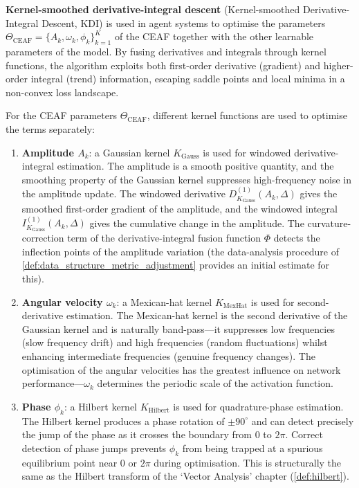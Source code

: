 \begin{definition}\label{def:kdi_agent}
\textbf{Kernel-smoothed derivative-integral descent} (Kernel-smoothed Derivative-Integral Descent, KDI) is used in agent systems to optimise the parameters $\Theta_{\text{CEAF}} = \{A_k, \omega_k, \phi_k\}_{k=1}^{K}$ of the CEAF together with the other learnable parameters of the model. By fusing derivatives and integrals through kernel functions, the algorithm exploits both first-order derivative (gradient) and higher-order integral (trend) information, escaping saddle points and local minima in a non-convex loss landscape.

For the CEAF parameters $\Theta_{\text{CEAF}}$, different kernel functions are used to optimise the terms separately:
\begin{enumerate}[label=(\roman*)]
    \item \textbf{Amplitude $A_k$}: a Gaussian kernel $K_{\text{Gauss}}$ is used for windowed derivative-integral estimation. The amplitude is a smooth positive quantity, and the smoothing property of the Gaussian kernel suppresses high-frequency noise in the amplitude update. The windowed derivative $D_{K_{\text{Gauss}}}^{(1)}(A_k, \Delta)$ gives the smoothed first-order gradient of the amplitude, and the windowed integral $I_{K_{\text{Gauss}}}^{(1)}(A_k, \Delta)$ gives the cumulative change in the amplitude. The curvature-correction term of the derivative-integral fusion function $\Phi$ detects the inflection points of the amplitude variation (the data-analysis procedure of \cref{def:data_structure_metric_adjustment} provides an initial estimate for this).
    \item \textbf{Angular velocity $\omega_k$}: a Mexican-hat kernel $K_{\text{MexHat}}$ is used for second-derivative estimation. The Mexican-hat kernel is the second derivative of the Gaussian kernel and is naturally band-pass---it suppresses low frequencies (slow frequency drift) and high frequencies (random fluctuations) whilst enhancing intermediate frequencies (genuine frequency changes). The optimisation of the angular velocities has the greatest influence on network performance---$\omega_k$ determines the periodic scale of the activation function.
    \item \textbf{Phase $\phi_k$}: a Hilbert kernel $K_{\text{Hilbert}}$ is used for quadrature-phase estimation. The Hilbert kernel produces a phase rotation of $\pm 90^\circ$ and can detect precisely the jump of the phase as it crosses the boundary from $0$ to $2\pi$. Correct detection of phase jumps prevents $\phi_k$ from being trapped at a spurious equilibrium point near $0$ or $2\pi$ during optimisation. This is structurally the same as the Hilbert transform of the `Vector Analysis' chapter (\cref{def:hilbert}).

\end{enumerate}
\end{definition}
